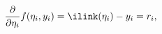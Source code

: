 \[
  \frac{\partial}{\partial \eta_i} f( \eta_i, y_i) = \ilink ( \eta_i) - y_i
                                                   = r_i,
\]
